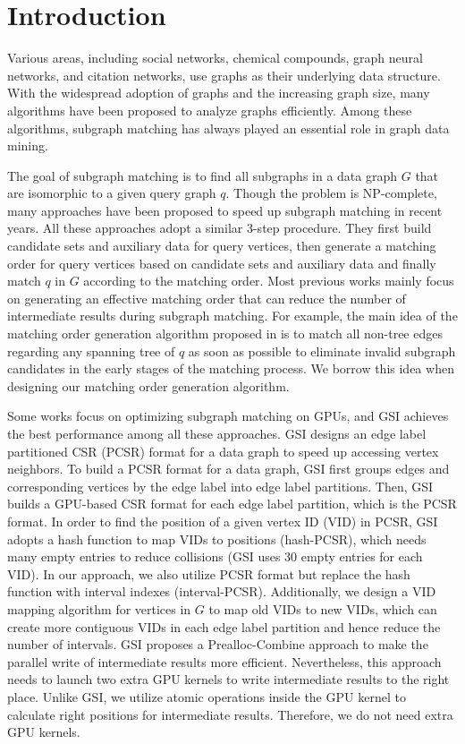 \section{Introduction}
Various areas, including social networks, chemical compounds, graph neural networks, and citation networks, use graphs as their underlying data structure. With the widespread adoption of graphs and the increasing graph size, many algorithms have been proposed to analyze graphs efficiently. Among these algorithms, subgraph matching has always played an essential role in graph data mining.

The goal of subgraph matching is to find all subgraphs in a data graph $G$ that are isomorphic to a given query graph $q$. Though the problem is NP-complete, many approaches  \cite{bhattarai2019ceci,guo2020gpu,tran2015fast,shi2020graphpi,bi2016efficient,zeng2020gsi,sun2020subgraph,guo2020exploiting,sun2020rapidmatch,lin2016network} have been proposed to speed up subgraph matching in recent years. All these approaches adopt a similar 3-step procedure. They first build candidate sets and auxiliary data for query vertices, then generate a matching order for query vertices based on candidate sets and auxiliary data and finally match $q$ in $G$ according to the matching order. Most previous works mainly focus on generating an effective matching order that can reduce the number of intermediate results during subgraph matching. For example, the main idea of the matching order generation algorithm proposed in \cite{bi2016efficient} is to match all non-tree edges regarding any spanning tree of $q$ as soon as possible to eliminate invalid subgraph candidates in the early stages of the matching process. We borrow this idea when designing our matching order generation algorithm.

Some works \cite{lin2016network,guo2020gpu,tran2015fast,zeng2020gsi,guo2020exploiting} focus on optimizing subgraph matching on GPUs, and GSI \cite{zeng2020gsi} achieves the best performance among all these approaches. GSI designs an edge label partitioned CSR (PCSR) format for a data graph to speed up accessing vertex neighbors. To build a PCSR format for a data graph, GSI first groups edges and corresponding vertices by the edge label into edge label partitions. Then, GSI builds a GPU-based CSR format for each edge label partition, which is the PCSR format. In order to find the position of a given vertex ID (VID) in PCSR, GSI adopts a hash function to map VIDs to positions (hash-PCSR), which needs many empty entries to reduce collisions (GSI uses 30 empty entries for each VID). In our approach, we also utilize PCSR format but replace the hash function with interval indexes (interval-PCSR). Additionally, we design a VID mapping algorithm for vertices in $G$ to map old VIDs to new VIDs, which can create more contiguous VIDs in each edge label partition and hence reduce the number of intervals. GSI proposes a Prealloc-Combine approach to make the parallel write of intermediate results more efficient. Nevertheless, this approach needs to launch two extra GPU kernels to write intermediate results to the right place. Unlike GSI, we utilize atomic operations inside the GPU kernel to calculate right positions for intermediate results. Therefore, we do not need extra GPU kernels.

